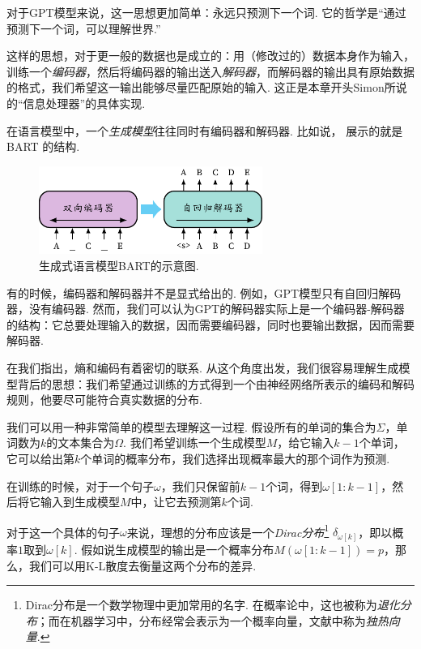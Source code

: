 对于GPT模型来说，这一思想更加简单：永远只预测下一个词. 它的哲学是“通过预测下一个词，可以理解世界.”

这样的思想，对于更一般的数据也是成立的：用（修改过的）数据本身作为输入，训练一个\textit{编码器}，然后将编码器的输出送入\textit{解码器}，而解码器的输出具有原始数据的格式，我们希望这一输出能够尽量匹配原始的输入. 这正是本章开头Simon所说的“信息处理器”的具体实现. 

在语言模型中，一个\textit{生成模型}往往同时有编码器和解码器. 比如说， 展示的就是BART  \cite{lewisBARTDenoisingSequencetoSequence2019} 的结构.

\begin{figure}[ht]
    \centering
    \includegraphics[width=0.65\textwidth]{figures/information-theory/bart.pdf}
    \caption{生成式语言模型BART的示意图.}
    \label{fig:autoencoder}
\end{figure}

有的时候，编码器和解码器并不是显式给出的. 例如，GPT模型只有自回归解码器，没有编码器. 然而，我们可以认为GPT的解码器实际上是一个编码器-解码器的结构：它总要处理输入的数据，因而需要编码器，同时也要输出数据，因而需要解码器. 

在我们指出，熵和编码有着密切的联系. 从这个角度出发，我们很容易理解生成模型背后的思想：我们希望通过训练的方式得到一个由神经网络所表示的编码和解码规则，他要尽可能符合真实数据的分布.

我们可以用一种非常简单的模型去理解这一过程. 假设所有的单词的集合为$\Sigma$，单词数为$k$的文本集合为$\Omega$. 我们希望训练一个生成模型$M$，给它输入$k-1$个单词，它可以给出第$k$个单词的概率分布，我们选择出现概率最大的那个词作为预测. 

在训练的时候，对于一个句子$\omega$，我们只保留前$k-1$个词，得到$\omega[1:k-1]$，然后将它输入到生成模型$M$中，让它去预测第$k$个词. 

对于这一个具体的句子$\omega$来说，理想的分布应该是一个\textit{Dirac分布}\footnote{Dirac分布是一个数学物理中更加常用的名字. 在概率论中，这也被称为\textit{退化分布}；而在机器学习中，分布经常会表示为一个概率向量，文献中称为\textit{独热向量}. } $\delta_{\omega[k]}$，即以概率$1$取到$\omega[k]$. 假如说生成模型的输出是一个概率分布$M(\omega[1:k-1])=p$，那么，我们可以用K-L散度去衡量这两个分布的差异.

